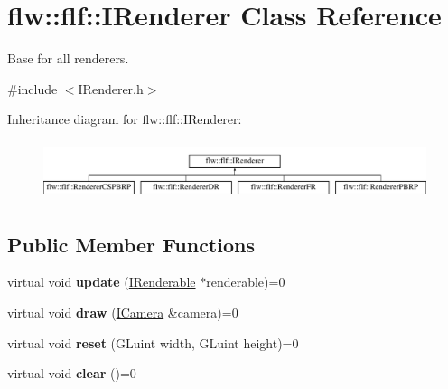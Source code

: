 \hypertarget{classflw_1_1flf_1_1IRenderer}{}\section{flw\+:\+:flf\+:\+:I\+Renderer Class Reference}
\label{classflw_1_1flf_1_1IRenderer}


Base for all renderers.  




{\ttfamily \#include $<$I\+Renderer.\+h$>$}

Inheritance diagram for flw\+:\+:flf\+:\+:I\+Renderer\+:\begin{figure}[H]
\begin{center}
\leavevmode
\includegraphics[height=1.739130cm]{classflw_1_1flf_1_1IRenderer}
\end{center}
\end{figure}
\subsection*{Public Member Functions}
\begin{DoxyCompactItemize}
\item 
\mbox{\label{classflw_1_1flf_1_1IRenderer_a3e7f0895caa92e95056be3404e28e788}} 
virtual void {\bfseries update} (\hyperlink{classflw_1_1flf_1_1IRenderable}{I\+Renderable} $\ast$renderable)=0
\item 
\mbox{\label{classflw_1_1flf_1_1IRenderer_a6b634d60f3fd4b6a28ec21cd7497208a}} 
virtual void {\bfseries draw} (\hyperlink{classflw_1_1flf_1_1ICamera}{I\+Camera} \&camera)=0
\item 
\mbox{\label{classflw_1_1flf_1_1IRenderer_ac90ec601eac15ad54071f62078241c89}} 
virtual void {\bfseries reset} (G\+Luint width, G\+Luint height)=0
\item 
\mbox{\label{classflw_1_1flf_1_1IRenderer_a425c79dae2088f55289aa69fabfa7bbe}} 
virtual void {\bfseries clear} ()=0
\end{DoxyCompactItemize}
